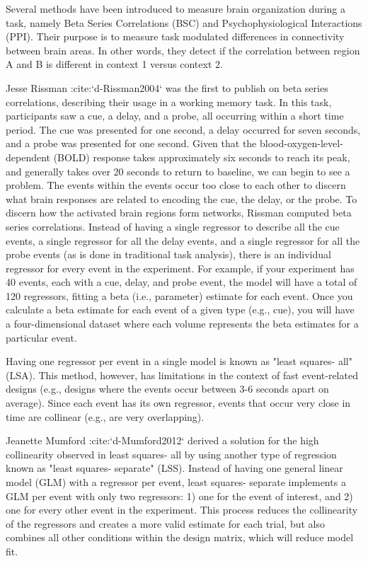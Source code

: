 \documentclass[phd,appendix,figures]{uithesis}
\begin{document}
\begin{itemize}
Several methods have been introduced to measure brain organization during a task,
namely Beta Series Correlations (BSC) and Psychophysiological Interactions (PPI).
Their purpose is to measure task modulated differences in connectivity between brain areas.
In other words, they detect if the correlation between region A and B is different
in context 1 versus context 2.

Jesse Rissman :cite:`d-Rissman2004` was the first to publish on beta series
correlations, describing their usage in a working memory task.
In this task, participants saw a cue, a delay, and a probe, all occurring
within a short time period.
The cue was presented for one second, a delay occurred for seven seconds,
and a probe was presented for one second.
Given that the blood-oxygen-level-dependent (BOLD) response
takes approximately six seconds to reach its peak, and generally takes over
20 seconds to return to baseline, we can begin to see a problem.
The events within the events occur too close to each other to discern what
brain responses are related to encoding the cue, the delay, or the probe.
To discern how the activated brain regions form networks, Rissman
computed beta series correlations.
Instead of having a single regressor to describe all the cue events,
a single regressor for all the delay events, and a single regressor for all the
probe events (as is done in traditional task analysis),
there is an individual regressor for every event in the experiment.
For example, if your experiment has 40 events, each with a cue, delay, and
probe event, the model will have a total of 120 regressors, fitting a beta
(i.e., parameter) estimate for each event.
Once you calculate a beta estimate for each event of a given type
(e.g., cue), you will have a four-dimensional dataset where each volume
represents the beta estimates for a particular event.

Having one regressor per event in a single model is known as "least squares- all" (LSA).
This method, however, has limitations in the context of fast event-related
designs (e.g., designs where the events occur between 3-6
seconds apart on average).
Since each event has its own regressor, events that occur very close in time
are collinear (e.g., are very overlapping).

Jeanette Mumford :cite:`d-Mumford2012` derived a solution for
the high collinearity observed in least squares- all by using another
type of regression known as "least squares- separate" (LSS).
Instead of having one general linear model (GLM) with a regressor per event,
least squares- separate implements a GLM per event with only two regressors:
1) one for the event of interest, and 2) one for every other event in the
experiment.
This process reduces the collinearity of the regressors and creates a more valid
estimate for each trial, but also combines all other conditions
within the design matrix, which will reduce model fit.


\end{itemize}
\end{document}

